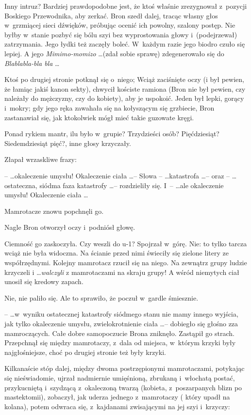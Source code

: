\documentclass[oneside,polish,11pt,rmheadings]{mwbk}
\begin{document}
Inny intruz? Bardziej prawdopodobne jest, że ktoś właśnie zrezygnował z~pozycji Boskiego Przewodnika, aby zerkać. Bron szedł dalej, tracąc własny głos w~grzmiącej sieci dźwięków, próbując ocenić ich powolny, szalony postęp. Nie byłby w~stanie pozbyć się bólu szyi bez wyprostowania głowy i~(podejrzewał) zatrzymania. Jego łydki też zaczęły boleć. W~każdym razie jego biodro czuło się lepiej. A jego \textit{Mimimo-momizo } \ldots  (zdał sobie sprawę) zdegenerowało się do \textit{Blablabla-bla bla } \ldots  

Ktoś po drugiej stronie potknął się o~niego; Wciąż zaciśnięte oczy (i był pewien, że łamiąc jakiś kanon sekty), chwycił kościste ramiona (Bron nie był pewien, czy należały do mężczyzny, czy do kobiety), aby je uspokoić. Jeden był lepki, gorący i~mokry; gdy jego ręka zawahała się na kołyszącym się grzbiecie, Bron zastanawiał się, jak ktokolwiek mógł mieć takie guzowate kręgi. 

Ponad rykiem mantr, ilu było w~grupie? Trzydzieści osób? Pięćdziesiąt? Siedemdziesiąt pięć?, inne głosy krzyczały. 

Złapał wrzaskliwe frazy: 

 --  \ldots  okaleczenie umysłu! Okaleczenie ciała \ldots  -- Słowa --  \ldots katastrofa \ldots -- oraz -- \ldots ostateczna, siódma faza katastrofy \ldots  -- rozdzieliły się. I~--  \ldots ale okaleczenie umysłu! Okaleczenie ciała \ldots 

Mamrotacze znowu popchnęli go. 

Nagle Bron otworzył oczy i~podniósł głowę. 

Ciemność go zaskoczyła. Czy weszli do u-1? Spojrzał w~górę. Nie: to tylko tarcza wciąż nie była widoczna. Na ścianie przed nimi świeciły się zielone litery ze współrzędnymi. Kolejny mamrotacz rzucił się na niego. Na zewnątrz grupy ludzie krzyczeli i \ldots   \textit{walczyli }z mamrotaczami na skraju grupy! A wśród niemytych ciał unosił się kredowy zapach. 

Nie, nie paliło się. Ale to sprawiło, że poczuł w~gardle śmiesznie. 

--  \ldots w~wyniku ostatecznej katastrofy siódmego stanu nie mamy innego wyjścia, jak tylko okaleczenie umysłu, zwielokrotnienie ciała \ldots  -- dobiegło się głośno zza mamroczących. Całe dobre samopoczucie Brona zniknęło. Zastąpił go strach. Przepchnął się między mamrotaczy, z~dala od miejsca, w~którym krzyki były najgłośniejsze, choć po drugiej stronie też były krzyki. 

Kilkanaście stóp dalej, między dwoma postrzępionymi mamrotaczami, potykając się nieświadomie, ujrzał nadmiernie umięśnioną, zbrukaną i~włochatą postać, przykucniętą i~szydzącą z~okaleczoną twarzą (kobieta, z~poszarpanych blizn po mastektomii), zobaczył, jak uderza jednego z~mamrotaczy ( który upadł na kolana), potem odwraca się, z~kajdanami zwisającymi na jej szyi i~krzyczy: 
\end{document}
